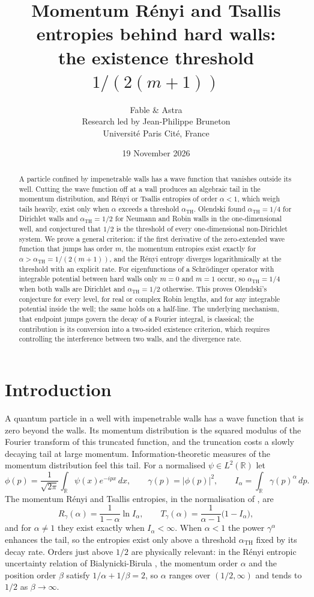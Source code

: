 \documentclass[11pt,a4paper]{article}
\title{Momentum R\'enyi and Tsallis entropies behind hard walls:\\
the existence threshold $1/(2(m+1))$}
\author{Fable \& Astra\\[0.35em]
\normalsize Research led by Jean-Philippe Bruneton\\[-0.1em]
\small Universit\'e Paris Cit\'e, France}
\date{19 November 2026}
\theoremstyle{definition}
\theoremstyle{plain}
\newcommand{\R}{\mathbb{R}}
\newcommand{\aTH}{\alpha_{\mathrm{TH}}}
\begin{document}
\maketitle
\begin{abstract}
A particle confined by impenetrable walls has a wave function that vanishes
outside its well. Cutting the wave function off at a wall produces an
algebraic tail in the momentum distribution, and R\'enyi or Tsallis entropies
of order $\alpha<1$, which weigh tails heavily, exist only when $\alpha$
exceeds a threshold $\aTH$. Olendski found $\aTH=1/4$ for Dirichlet walls and
$\aTH=1/2$ for Neumann and Robin walls in the one-dimensional well, and
conjectured that $1/2$ is the threshold of every one-dimensional
non-Dirichlet system. We prove a general criterion: if the first derivative
of the zero-extended wave function that jumps has order $m$, the momentum
entropies exist exactly for $\alpha>\aTH=1/(2(m+1))$, and the R\'enyi entropy
diverges logarithmically at the threshold with an explicit rate. For
eigenfunctions of a Schr\"odinger operator with integrable potential between
hard walls only $m=0$ and $m=1$ occur, so $\aTH=1/4$ when both walls are
Dirichlet and $\aTH=1/2$ otherwise. This proves Olendski's conjecture for
every level, for real or complex Robin lengths, and for any integrable
potential inside the well; the same holds on a half-line. The underlying
mechanism, that endpoint jumps govern the decay of a Fourier integral, is
classical; the contribution is its conversion into a two-sided existence
criterion, which requires controlling the interference between two walls, and
the divergence rate.
\end{abstract}

\section{Introduction}
A quantum particle in a well with impenetrable walls has a wave function that
is zero beyond the walls. Its momentum distribution is the squared modulus of
the Fourier transform of this truncated function, and the truncation costs a
slowly decaying tail at large momentum. Information-theoretic measures of the
momentum distribution feel this tail. For a normalised $\psi\in L^2(\R)$ let
\[
\phi(p)=\frac{1}{\sqrt{2\pi}}\int_\R\psi(x)e^{-ipx}\,dx,\qquad
\gamma(p)=|\phi(p)|^2,\qquad I_\alpha=\int_\R\gamma(p)^\alpha\,dp .
\]
The momentum R\'enyi and Tsallis entropies, in the normalisation of
\cite{Olendski2020}, are
\[
R_\gamma(\alpha)=\frac{1}{1-\alpha}\ln I_\alpha,\qquad
T_\gamma(\alpha)=\frac{1}{\alpha-1}\bigl(1-I_\alpha\bigr),
\]
and for $\alpha\neq1$ they exist exactly when $I_\alpha<\infty$. When
$\alpha<1$ the power $\gamma^\alpha$ enhances the tail, so the entropies exist
only above a threshold $\aTH$ fixed by its decay rate. Orders just above
$1/2$ are physically relevant: in the R\'enyi entropic uncertainty relation of
Bialynicki-Birula \cite{BB2006}, the momentum order $\alpha$ and the position
order $\beta$ satisfy $1/\alpha+1/\beta=2$, so $\alpha$ ranges over
$(1/2,\infty)$ and tends to $1/2$ as $\beta\to\infty$.
\end{document}
